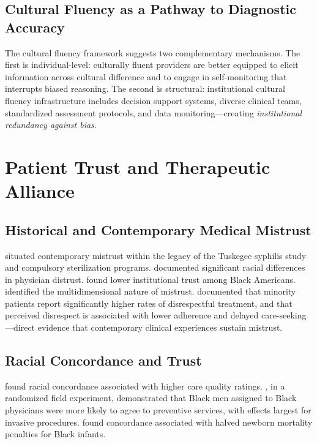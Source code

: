 \documentclass[12pt, a4paper]{article}
\begin{document}
\subsection{Cultural Fluency as a Pathway to Diagnostic Accuracy}

The cultural fluency framework suggests two complementary mechanisms. The first is individual-level: culturally fluent providers are better equipped to elicit information across cultural difference and to engage in self-monitoring that interrupts biased reasoning. The second is structural: institutional cultural fluency infrastructure includes decision support systems, diverse clinical teams, standardized assessment protocols, and data monitoring---creating \textit{institutional redundancy against bias}.

\section{Patient Trust and Therapeutic Alliance}

\subsection{Historical and Contemporary Medical Mistrust}

\citet{gamble1997} situated contemporary mistrust within the legacy of the Tuskegee syphilis study and compulsory sterilization programs. \citet{armstrong2013} documented significant racial differences in physician distrust. \citet{boulware2003} found lower institutional trust among Black Americans. \citet{williamson2019} identified the multidimensional nature of mistrust. \citet{blanchard2004} documented that minority patients report significantly higher rates of disrespectful treatment, and that perceived disrespect is associated with lower adherence and delayed care-seeking---direct evidence that contemporary clinical experiences sustain mistrust.

\subsection{Racial Concordance and Trust}

\citet{saha1999} found racial concordance associated with higher care quality ratings. \citet{alsan2019}, in a randomized field experiment, demonstrated that Black men assigned to Black physicians were more likely to agree to preventive services, with effects largest for invasive procedures. \citet{greenwood2020} found concordance associated with halved newborn mortality penalties for Black infants.
\end{document}
